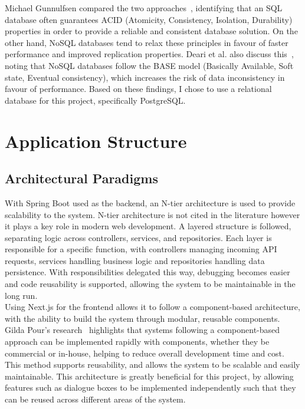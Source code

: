 \documentclass[]{final_report}
\begin{document}
Michael Gunnulfsen compared the two approaches~\cite{SQL_COMPARE}, identifying that an SQL database often guarantees ACID (Atomicity, Consistency, Isolation, Durability) properties in order to provide a reliable and consistent database solution. On the other hand, NoSQL databases tend to relax these principles in favour of faster performance and improved replication properties. Deari et al. also discuss this~\cite{SQL}, noting that NoSQL databases follow the BASE model (Basically Available, Soft state, Eventual consistency), which increases the risk of data inconsistency in favour of performance. Based on these findings, I chose to use a relational database for this project, specifically PostgreSQL.

\section{Application Structure}

\subsection{Architectural Paradigms}

With Spring Boot used as the backend, an N-tier architecture is used to provide scalability to the system. N-tier architecture is not cited in the literature however it plays a key role in modern web development. A layered structure is followed, separating logic across controllers, services, and repositories. Each layer is responsible for a specific function, with controllers managing incoming API requests, services handling business logic and repositories handling data persistence. With responsibilities delegated this way, debugging becomes easier and code reusability is supported, allowing the system to be maintainable in the long run.\\

Using Next.js for the frontend allows it to follow a component-based architecture, with the ability to build the system through modular, reusable components. Gilda Pour's research~\cite{GPOUR_COMPONENT} highlights that systems following a component-based approach can be implemented rapidly with components, whether they be commercial or in-house, helping to reduce overall development time and cost. This method supports reusability, and allows the system to be scalable and easily maintainable. This architecture is greatly beneficial for this project, by allowing features such as dialogue boxes to be implemented independently such that they can be reused across different areas of the system.\\
\end{document}
